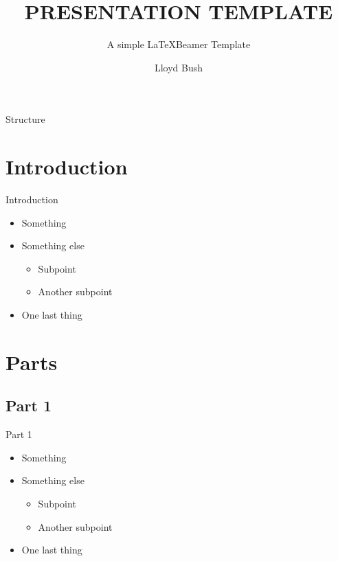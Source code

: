 \documentclass[aspectratio=169,t]{beamer}
\title{PRESENTATION TEMPLATE}
\subtitle{A simple \LaTeX Beamer Template}
\author{Lloyd Bush}
\institute{Gymnasium Dresden-Bühlau}
\date{}
\begin{document}
\begin{frame}
	\titlepage
\end{frame}

\begin{frame}{Structure}
	\begin{Large}
		\tableofcontents[pausesections]
	\end{Large}
\end{frame}

\section{Introduction}
\begin{frame}{Introduction}
	\begin{itemize}
		\pause
		\item Something
		      \pause
		\item Something else
		      \begin{itemize}
			      \item Subpoint
			      \item Another subpoint
		      \end{itemize}
		      \pause
		\item One last thing
	\end{itemize}
\end{frame}

\section{Parts}
\subsection{Part 1}
\begin{frame}{Part 1}
	\begin{itemize}
		\pause
		\item Something
		      \pause
		\item Something else
		      \begin{itemize}
			      \item Subpoint
			      \item Another subpoint
		      \end{itemize}
		      \pause
		\item One last thing
	\end{itemize}
\end{frame}
\end{document}
